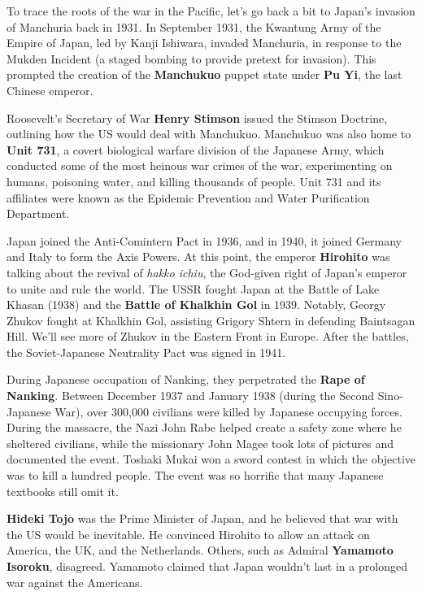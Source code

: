 To trace the roots of the war in the Pacific, let's go back a bit to Japan's invasion of Manchuria back in 1931.
In September 1931, the Kwantung Army of the Empire of Japan, led by Kanji Ishiwara, invaded Manchuria,
in response to the Mukden Incident (a staged bombing to provide pretext for invasion).
This prompted the creation of the \textbf{Manchukuo} puppet state under \textbf{Pu Yi}, the last Chinese emperor.

Roosevelt's Secretary of War \textbf{Henry Stimson} issued the Stimson Doctrine,
outlining how the US would deal with Manchukuo.
Manchukuo was also home to \textbf{Unit 731}, a covert biological warfare division of the Japanese Army,
which conducted some of the most heinous war crimes of the war,
experimenting on humans, poisoning water, and killing thousands of people.
Unit 731 and its affiliates were known as the Epidemic Prevention and Water Purification Department.

Japan joined the Anti-Comintern Pact in 1936, and in 1940, it joined Germany and Italy to form the Axis Powers.
At this point, the emperor \textbf{Hirohito} was talking about the revival of \textit{hakko ichiu},
the God-given right of Japan's emperor to unite and rule the world.
The USSR fought Japan at the Battle of Lake Khasan (1938) and the \textbf{Battle of Khalkhin Gol} in 1939.
Notably, Georgy Zhukov fought at Khalkhin Gol, assisting Grigory Shtern in defending Baintsagan Hill.
We'll see more of Zhukov in the Eastern Front in Europe.
After the battles, the Soviet-Japanese Neutrality Pact was signed in 1941.

During Japanese occupation of Nanking, they perpetrated the \textbf{Rape of Nanking}.
Between December 1937 and January 1938 (during the Second Sino-Japanese War),
over 300,000 civilians were killed by Japanese occupying forces.
During the massacre, the Nazi John Rabe helped create a safety zone where he sheltered civilians,
while the missionary John Magee took lots of pictures and documented the event.
Toshaki Mukai won a sword contest in which the objective was to kill a hundred people.
The event was so horrific that many Japanese textbooks still omit it.

\textbf{Hideki Tojo} was the Prime Minister of Japan, and he believed that war with the US would be inevitable.
He convinced Hirohito to allow an attack on America, the UK, and the Netherlands.
Others, such as Admiral \textbf{Yamamoto Isoroku}, disagreed.
Yamamoto claimed that Japan wouldn't last in a prolonged war against the Americans.


